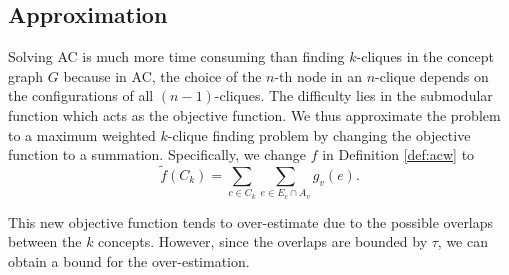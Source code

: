 \subsection{Approximation}
Solving AC is much more time consuming than finding $k$-cliques in the
concept graph $G$ because in AC, the choice of the $n$-th node in an $n$-clique
depends on the configurations of all $(n-1)$-cliques.
The difficulty lies in the submodular function which acts
as the objective function.
We thus approximate the problem to a maximum weighted $k$-clique finding
problem by changing the objective function
to a summation. Specifically, we change $f$ in Definition \ref{def:acw} to
\begin{equation}
\tilde{f}(C_k)=\sum_{c\in C_k}{\sum_{e\in E_c\cap A_v}{g_v(e)}}.
\label{eq:approxf}
\end{equation}

This new objective function tends to over-estimate due to the
possible overlaps between the $k$ concepts.
However, since the overlaps are bounded by $\tau$,
we can obtain a bound for the over-estimation.


